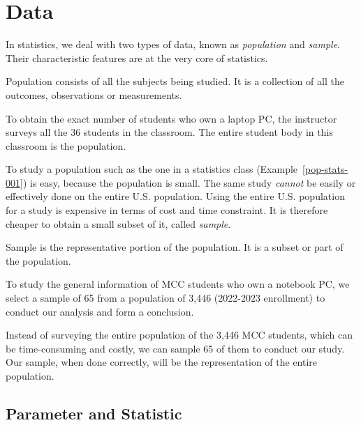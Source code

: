 \section{Data} 

In statistics, we deal with two types of data, known as {\it{population}} and {\it{sample}}. Their characteristic features are at the very core of statistics.  

\begin{definition}[Population] 
Population consists of all the subjects being studied. It is a collection of all the outcomes, observations or measurements.
\end{definition}

\begin{example} \label{pop-stats-001} 
To obtain the exact number of students who own a laptop PC, the instructor surveys all the 36 students in the classroom. The entire student body in this classroom is the population.  
\end{example}  

To study a population such as the one in a statistics class (Example~\ref{pop-stats-001}) is easy, because the population is small. The same study {\it{cannot}} be easily or effectively done on the entire U.S. population. Using the entire U.S. population for a study is expensive in terms of cost and time constraint. It is therefore cheaper to obtain a small subset of it, called {\it{sample}}.
 
\begin{definition}[Sample] 
Sample is the representative portion of the population. It is a subset or part of the population.
\end{definition}

\begin{example} \label{sam-stats-001} 
To study the general information of MCC students who own a notebook PC, we select a sample of 65 from a population of 3,446 (2022-2023 enrollment) to conduct our analysis and form a conclusion. 
\end{example}  

Instead of surveying the entire population of the 3,446 MCC students, which can be time-consuming and costly, we can sample 65 of them to conduct our study. Our sample, when done correctly, will be the representation of the entire population. 

\subsection{Parameter and Statistic}


